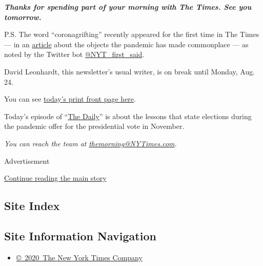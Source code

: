 \emph{\textbf{Thanks for spending part of your morning with The Times.
See you tomorrow.}}

P.S. The word ``coronagrifting'' recently appeared for the first time in
The Times --- in an
\href{https://www.nytimes3xbfgragh.onion/2020/08/01/arts/design/virus-design-objects.html}{article}
about the objects the pandemic has made commonplace --- as noted by the
Twitter bot
\href{https://twitter.com/NYT_first_said}{@NYT\_first\_said}.

David Leonhardt, this newsletter's usual writer, is on break until
Monday, Aug. 24.

You can see
\href{https://static01.graylady3jvrrxbe.onion/images/2020/08/04/nytfrontpage/scan.pdf}{today's
print front page here}.

Today's episode of
``\href{https://www.nytimes3xbfgragh.onion/thedaily}{The Daily}'' is
about the lessons that state elections during the pandemic offer for the
presidential vote in November.

\emph{You can reach the team at}
\href{mailto:themorning@NYTimes.com}{\emph{themorning@NYTimes.com}}\emph{.}

Advertisement

\protect\hyperlink{after-bottom}{Continue reading the main story}

\hypertarget{site-index}{%
\subsection{Site Index}\label{site-index}}

\hypertarget{site-information-navigation}{%
\subsection{Site Information
Navigation}\label{site-information-navigation}}

\begin{itemize}
\tightlist
\item
  \href{https://help.nytimes3xbfgragh.onion/hc/en-us/articles/115014792127-Copyright-notice}{©~2020~The
  New York Times Company}
\end{itemize}


